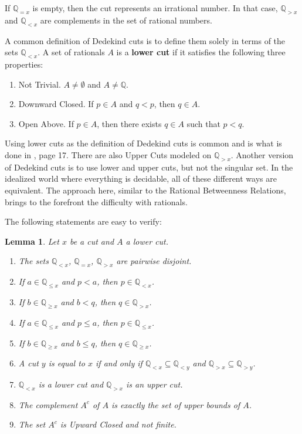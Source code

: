 \documentclass[12pt]{article}
\newtheorem{lemma}{Lemma}[section]
\newcommand{\qcut}[2][x]{\ensuremath{\mathbb{Q}_{#2 #1}}}
\newcommand{\qlt}[1][x]{\qcut[#1]{<}}
\newcommand{\qeq}[1][x]{\qcut[#1]{=}}
\newcommand{\qgt}[1][x]{\qcut[#1]{>}}
\newcommand{\qgeq}[1][x]{\qcut[#1]{\geq}}
\newcommand{\qleq}[1][x]{\qcut[#1]{\leq}}
\begin{document}
If $\qeq$ is empty, then the cut represents an irrational number. In that case, $\qgt$ and $\qlt$ are complements in the set of rational numbers. 

A common definition of Dedekind cuts is to define them solely in terms of the sets $\qlt$.  A set of rationals $A$ is a \textbf{lower cut} if it satisfies the following three properties: 
\begin{enumerate}
    \item Not Trivial. $A \neq \emptyset$ and $A \neq \mathbb{Q}$.
    \item Downward Closed. If $p \in A$ and $q < p$, then $q \in A$. 
    \item Open Above. If $p \in A$, then there exists $q \in A$ such that $p < q$.
\end{enumerate}
Using lower cuts as the definition of Dedekind cuts is common and is what is done in \cite{rudin}, page 17. There are also Upper Cuts modeled on $\qgt$. Another version of Dedekind cuts is to use lower and upper cuts, but not the singular set. In the idealized world where everything is decidable, all of these different ways are equivalent. The approach here, similar to the Rational Betweenness Relations, brings to the forefront the difficulty with rationals. 

The following statements are easy to verify: 
\begin{lemma}\label{lem:cuts}
Let $x$ be a cut and $A$ a lower cut.  
\begin{enumerate}[label=\alph*., ref=\thelemma(\alph*)]
    \item\label{lem:cuts-disj} The sets $\qlt$, $\qeq$, $\qgt$ are pairwise disjoint.
    \item If $a \in \qleq$ and $p < a$, then $p \in \qlt$. 
    \item If $b \in \qgeq$ and $b < q$, then $q \in \qgt$. 
    \item If $a \in \qleq$ and $p \leq a$, then $p \in \qleq$. 
    \item If $b \in \qgeq$ and $b \leq q$, then $q \in \qgeq$. 
    \item A cut $y$ is equal to $x$ if and only if $\qlt \subseteq \qlt[y]$ and $\qgt \subseteq \qgt[y]$.
    \item $\qlt$ is a lower cut and $\qgt$ is an upper cut. 
    \item The complement $A^c$ of $A$ is exactly the set of upper bounds of $A$. 
    \item The set $A^c$ is Upward Closed and not finite. 
    
\end{enumerate}
\end{lemma}
\end{document}
